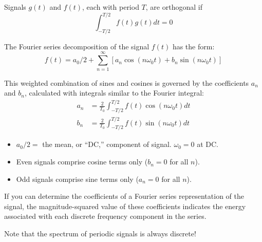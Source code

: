 \documentclass[11pt,letterpaper,draft]{exam}
\begin{document}
Signals $g(t)$ and $f(t)$, each with period $T$, are orthogonal if
\begin{equation*}
\int^{T/2}_{-T/2}f(t)g(t)dt = 0
\end{equation*}

The Fourier series decomposition of the signal $f(t)$ has the form:
\begin{equation*}
f(t) = a_{0}/2 + \sum^{\infty}_{n=1}[a_{n}\cos(n\omega_{0}t)+b_{n}\sin(n\omega_{0}t)]
\end{equation*}

This weighted combination of sines and cosines is governed by the coefficients
$a_{n}$ and $b_{n}$, calculated with integrals similar to the Fourier integral:
\begin{equation*}
\begin{split}
a_{n}&=\frac{2}{T_{0}}\int^{T/2}_{-T/2}f(t)\cos(n\omega_{0}t)dt\\
b_{n}&=\frac{2}{T_{0}}\int^{T/2}_{-T/2}f(t)\sin(n\omega_{0}t)dt
\end{split}
\end{equation*}

\begin{itemize}
\item $a_{0}/2 =$  the mean, or ``DC,'' component of signal. $\omega_{0} = 0$ at DC.

\item Even signals comprise cosine terms only ($b_{n}=0$ for all $n$).

\item Odd signals comprise sine terms only ($a_{n}=0$ for all $n$).
\end{itemize}

If you can determine the coefficients of a Fourier series
representation of the signal, the magnitude-squared value of these
coefficients indicates the energy associated with each discrete
frequency component in the series.

Note that the spectrum of periodic signals is always discrete!
\end{document}
